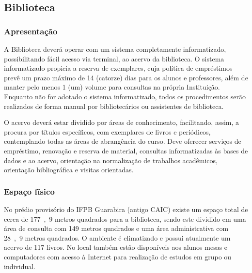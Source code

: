 

\subsection{Biblioteca}

\subsubsection{Apresenta\c{c}\~ao}

A Biblioteca deverá operar com um sistema completamente informatizado, possibilitando fácil acesso via terminal, ao acervo da biblioteca. O sistema informatizado propicia a reserva de exemplares, cuja política de empréstimos prevê um prazo máximo de 14 (catorze) dias para os alunos e professores, além de manter pelo menos 1 (um) volume para consultas na própria Instituição. Enquanto não for adotado o sistema informatizado, todos os procedimentos serão realizados de forma manual por bibliotecários ou assistentes de biblioteca.

O acervo deverá estar dividido por áreas de conhecimento, facilitando, assim, a procura por títulos específicos, com exemplares de livros e periódicos, contemplando todas as áreas de abrangência do curso. Deve oferecer serviços de empréstimo, renovação e reserva de material, consultas informatizadas às bases de dados e ao acervo, orientação na normalização de trabalhos acadêmicos, orientação bibliográfica e visitas orientadas.

\subsubsection{Espa\c{c}o f\'isico}

No pr\'edio provis\'orio do IFPB Guarabira (antigo CAIC) existe um espaço total de cerca de \unit{177,9} metros quadrados para a biblioteca, sendo este dividido em uma área de consulta com \unit{149} metros quadrados e uma área administrativa com \unit{28,9} metros quadrados. O ambiente \'e climatizado e possui atualmente um acervo de 117 livros. No local também estão disponíveis aos alunos mesas e computadores com acesso \`a Internet para realiza\c{c}\~ao de estudos em grupo ou individual.

